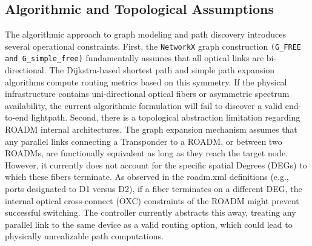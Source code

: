 \subsection*{\small Algorithmic and Topological Assumptions}
The algorithmic approach to graph modeling and path discovery introduces several operational constraints. First, the \texttt{NetworkX} graph construction \texttt{(G\_FREE and G\_simple\_free)} fundamentally assumes that all optical links are bi-directional. The Dijkstra-based shortest path and simple path expansion algorithms compute routing metrics based on this symmetry. If the physical infrastructure contains uni-directional optical fibers or asymmetric spectrum availability, the current algorithmic formulation will fail to discover a valid end-to-end lightpath. Second, there is a topological abstraction limitation regarding ROADM internal architectures. The graph expansion mechanism assumes that any parallel links connecting a Transponder to a ROADM, or between two ROADMs, are functionally equivalent as long as they reach the target node. However, it currently does not account for the specific spatial Degrees (DEGs) to which these fibers terminate. As observed in the roadm.xml definitions (e.g., ports designated to D1 versus D2), if a fiber terminates on a different DEG, the internal optical cross-connect (OXC) constraints of the ROADM might prevent successful switching. The controller currently abstracts this away, treating any parallel link to the same device as a valid routing option, which could lead to physically unrealizable path computations.

